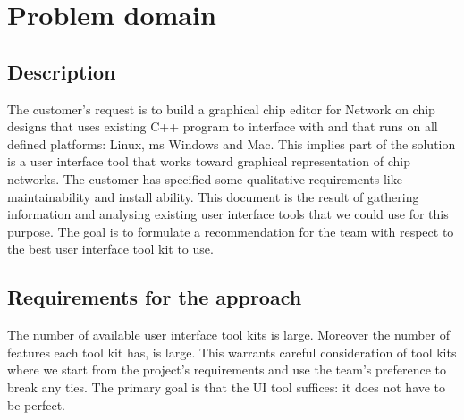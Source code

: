\section{Problem domain}
\subsection{Description}

The customer's request is to build a graphical chip editor for Network on chip
designs that uses existing C++ program to interface with and that runs on all
defined platforms: Linux, ms Windows and Mac. This implies part of the solution
is a user interface tool that works toward graphical representation of chip
networks. The customer has specified some qualitative requirements like
maintainability and install ability. This document is the result of gathering
information and analysing existing user interface tools that we could use for
this purpose. The goal is to formulate a recommendation for the team with
respect to the best user interface tool kit to use.

\subsection{Requirements for the approach}

The number of available user interface tool kits is large.  Moreover the number
of features each tool kit has, is large. This warrants careful consideration of
tool kits where we start from the project's requirements and use the team's
preference to break any ties.  The primary goal is that the UI tool suffices:
it does not have to be perfect.
